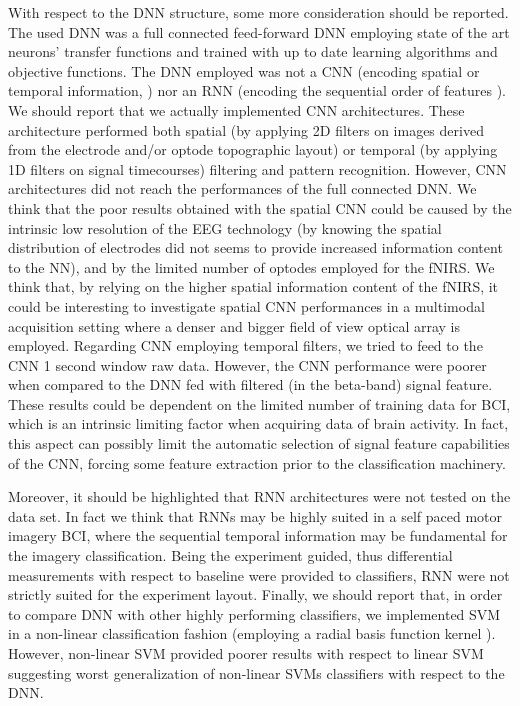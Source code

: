 \documentclass[12pt]{iopart}
\begin{document}
With respect to the DNN structure, some more consideration should be reported.
The used  DNN  was a full connected feed-forward DNN employing state of the art neurons' transfer functions and trained with up to date learning algorithms and objective functions.  The DNN employed was not a CNN (encoding spatial or temporal information, \parencite{krizhevsky2012imagenet,kalchbrenner2014convolutional}) nor an RNN (encoding the sequential order of features \parencite{mikolov2010recurrent,hochreiter1997long}).
We should report that we actually implemented CNN architectures. These architecture performed both spatial  (by applying 2D filters on images derived from the electrode and/or optode topographic layout) or temporal (by applying 1D filters on signal timecourses) filtering and pattern recognition. However, CNN architectures did not reach the performances of the full connected DNN. We think that the poor results obtained with the spatial CNN could be caused by the intrinsic low resolution of the EEG technology \parencite{pfurtscheller1997motor} (by knowing the spatial distribution of electrodes did not seems to provide increased information content to the NN), and by the limited number of optodes employed for the fNIRS. We think that, by relying on the higher spatial information content of the fNIRS, it could be interesting to investigate spatial CNN performances in a multimodal acquisition setting where a denser and bigger field of view optical array is employed. Regarding CNN employing temporal filters, we tried to feed to the CNN  1 second window raw data. However, the CNN performance were poorer when compared to the DNN fed with filtered (in the beta-band) signal feature. These results could be dependent on the limited number of training data for BCI, which is an intrinsic limiting factor when acquiring data of brain activity. In fact, this aspect can possibly limit the automatic selection of signal feature capabilities of the CNN, forcing some feature extraction prior to the classification machinery.

Moreover, it should be  highlighted that RNN architectures were not tested on the data set. In fact we think that RNNs may be highly suited in a self paced motor imagery BCI, where the sequential temporal information may be fundamental for the imagery classification. Being the experiment guided, thus differential measurements with respect to baseline were provided to classifiers, RNN were not strictly suited for the experiment layout. 
Finally, we should report that, in order to compare DNN with other highly performing classifiers, we implemented SVM in a non-linear classification fashion (employing a radial basis function kernel \parencite{park1991universal}). However, non-linear SVM provided poorer results with respect to linear SVM suggesting worst generalization of non-linear SVMs classifiers with respect to the DNN.
\end{document}
